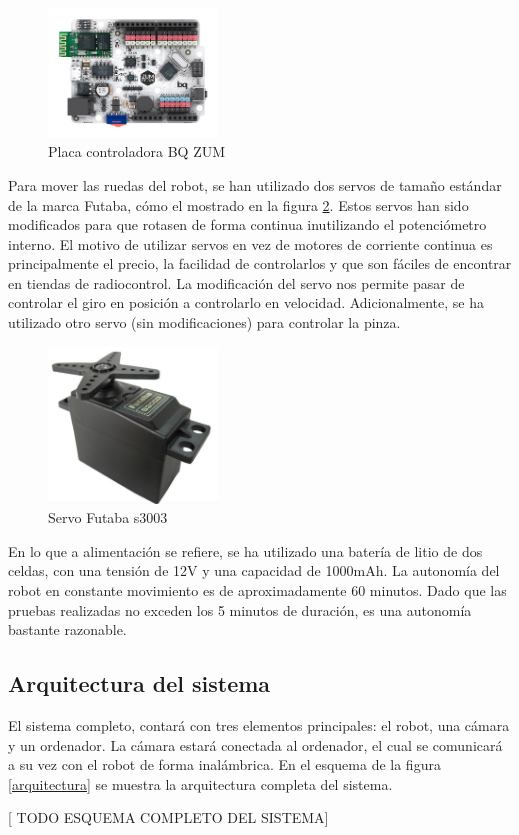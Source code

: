 \begin{figure}[H]
        \centering
        \includegraphics[width=0.4\textwidth]{images/zum.jpg}
        \caption{Placa controladora BQ ZUM}
        \label{fig:zum}
\end{figure} 

Para mover las ruedas del robot, se han utilizado dos servos de tamaño estándar de la marca Futaba, cómo el mostrado en la figura \ref{fig:futaba}. Estos servos han sido modificados para que rotasen de forma continua inutilizando el potenciómetro interno. El motivo de utilizar servos en vez de motores de corriente continua es principalmente el precio, la facilidad de controlarlos y que son fáciles de encontrar en tiendas de radiocontrol. La modificación del servo nos permite pasar de controlar el giro en posición a controlarlo en velocidad. Adicionalmente, se ha utilizado otro servo (sin modificaciones) para controlar la pinza.

\begin{figure}[H]
        \centering
        \includegraphics[width=0.4\textwidth]{images/futaba.jpg}
        \caption{Servo Futaba s3003}
        \label{fig:futaba}
\end{figure} 
En lo que a alimentación se refiere, se ha utilizado una batería de litio de dos celdas, con una tensión de 12V y una capacidad de 1000mAh. La autonomía del robot en constante movimiento es de aproximadamente 60 minutos. Dado que las pruebas realizadas no exceden los 5 minutos de duración, es una autonomía bastante razonable.

\subsection{Arquitectura del sistema}

El sistema completo, contará con tres elementos principales: el robot, una cámara y un ordenador. La cámara estará conectada al ordenador, el cual se comunicará a su vez con el robot de forma inalámbrica. En el esquema de la figura \ref{arquitectura} se muestra la arquitectura completa del sistema.

[ TODO ESQUEMA COMPLETO DEL SISTEMA]